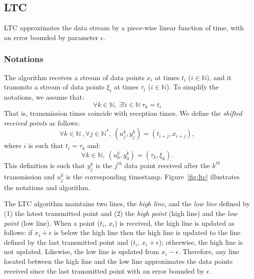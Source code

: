 \documentclass{report}
\begin{document}
\subsection{LTC}
\label{sec:ltc}
LTC approximates the data stream
by a piece-wise linear function of time, with an error bounded by parameter $\epsilon$.

\subsubsection{Notations}

The algorithm receives a stream of data points $x_i$
at times $t_i$ ($i \in \mathbb{N}$), and it transmits a stream of data points $\xi_i$
at times $\tau_i$ ($i \in \mathbb{N}$). To simplify the notations, we assume that:
\begin{equation*}
\forall k \in \mathbb{N}, \  \exists ! i \in \mathbb{N} \  \tau_k = t_i
\end{equation*}
That is, transmission times coincide with reception times.
We define the \emph{shifted received points} as follows:
\begin{equation*}
\forall k \in \mathbb{N}\ , \forall j \in \mathbb{N^*},\ (u^k_j, y^k_j) = (t_{i+j}, x_{i+j}), 
\end{equation*}
where $i$ is such that $t_i = \tau_k$ and:
\begin{equation*}
\forall k \in \mathbb{N},\  (u^k_0, y^k_0) = (\tau_k, \xi_k).
\end{equation*}
This definition is such that $y^k_j$ is the $j^{th}$ data point received
after the $k^{th}$ transmission and $u^k_j$ is the corresponding timestamp.
Figure~\ref{fig:ltc} illustrates the notations and algorithm.

The LTC algorithm maintains two lines, the \emph{high line}, and the
\emph{low line} defined by (1) the latest transmitted point and (2) the
\emph{high point} (high line) and the \emph{low point} (low line). When
a point ($t_i$, $x_i$) is received, the high line is updated as
follows: if $x_i+\epsilon$ is below the high line then the high line is
updated to the line defined by the last transmitted point and ($t_i$,
$x_i+\epsilon$); otherwise, the high line is not updated. Likewise, the low line
is updated from $x_i-\epsilon$. Therefore, any line located between the
high line and the low line approximates the data points received since
the last transmitted point with an error bounded by $\epsilon$.
\end{document}
